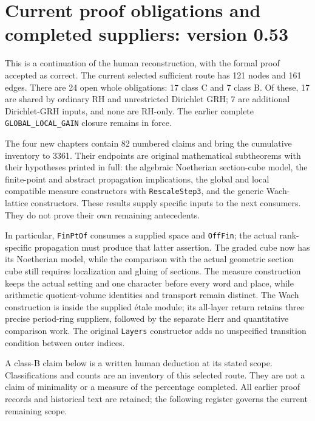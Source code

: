 \section{Current proof obligations and completed suppliers: version 0.53}
\label{sec:dependency-audit-v53}

This is a continuation of the human reconstruction, with the formal
proof accepted as correct. The current selected sufficient route has
121 nodes and 161 edges. There are 24 open whole obligations:
17 class C and 7 class B. Of these, 17 are shared by ordinary
RH and unrestricted Dirichlet GRH; 7 are additional Dirichlet-GRH
inputs, and none are RH-only. The earlier complete
\texttt{GLOBAL\_\allowbreak LOCAL\_\allowbreak GAIN} closure remains in force.

The four new chapters contain 82 numbered claims and bring the
cumulative inventory to 3361. Their endpoints are original
mathematical subtheorems with their hypotheses printed in full:
the algebraic Noetherian section-cube model, the finite-point and
abstract propagation implications, the global and local compatible
measure constructors with \texttt{Rescale\allowbreak Step3}, and the generic
Wach-lattice constructors. These results supply specific inputs to
the next consumers. They do not prove their own remaining antecedents.

In particular, \texttt{Fin\allowbreak Pt\allowbreak Of} consumes a supplied space and
\texttt{Off\allowbreak Fin}; the actual rank-specific propagation must produce
that latter assertion. The graded cube now has its Noetherian model,
while the comparison with the actual geometric section cube still
requires localization and gluing of sections. The measure construction
keeps the actual setting and one character before every word and
place, while arithmetic quotient-volume identities and transport
remain distinct. The Wach construction is inside the supplied
\'etale module; its all-layer return retains three precise period-ring
suppliers, followed by the separate Herr and quantitative comparison
work. The original \texttt{Layers} constructor adds no unspecified
transition condition between outer indices.

A class-B claim below is a written human deduction at its stated scope.
Classifications and counts are an inventory of this selected route.
They are not a claim of minimality or a measure of the percentage
completed. All earlier proof records and historical text are retained;
the following register governs the current remaining scope.

